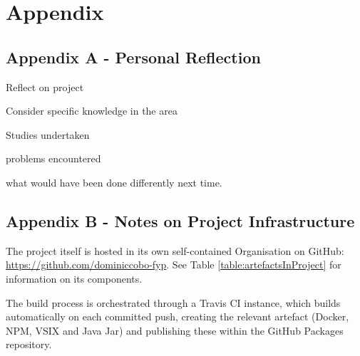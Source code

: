 \chapter{Appendix}

\section{Appendix A - Personal Reflection}


Reflect on project

Consider specific knowledge in the area

Studies undertaken

problems encountered

what would have been done differently next time.

\section{Appendix B - Notes on Project Infrastructure}
\label{projectAssets}

The project itself is hosted in its own self-contained Organisation on GitHub: \url{https://github.com/dominiccobo-fyp}. See Table \ref{table:artefactsInProject} for information on its components.

The build process is orchestrated through a Travis CI instance, which builds automatically on each committed push, creating the relevant artefact (Docker, NPM, VSIX and Java Jar) and publishing these within the GitHub Packages repository.

